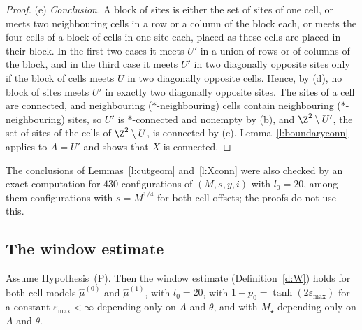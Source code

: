 \begin{proof}
(e) \emph{Conclusion.} A block of sites is either the set of sites of one cell, or meets two neighbouring cells in a row or a column of the block each, or meets the four cells of a block of cells in one site each, placed as these cells are placed in their block. In the first two cases it meets $U'$ in a union of rows or of columns of the block, and in the third case it meets $U'$ in two diagonally opposite sites only if the block of cells meets $U$ in two diagonally opposite cells. Hence, by (d), no block of sites meets $U'$ in exactly two diagonally opposite sites. The sites of a cell are connected, and neighbouring ($*$-neighbouring) cells contain neighbouring ($*$-neighbouring) sites, so $U'$ is $*$-connected and nonempty by (b), and $\Z^2 \setminus U'$, the set of sites of the cells of $\Z^2 \setminus U$, is connected by (c). Lemma~\ref{l:boundaryconn} applies to $A = U'$ and shows that $X$ is connected.
\end{proof}

The conclusions of Lemmas~\ref{l:cutgeom} and~\ref{l:Xconn} were also checked by an exact computation for $430$ configurations of $(M, s, y, i)$ with $l_0 = 20$, among them configurations with $s = M^{1/4}$ for both cell offsets; the proofs do not use this.

\subsection{The window estimate}\label{s:windowproof}

\begin{theorem}\label{t:cutMOS}
Assume Hypothesis~(P). Then the window estimate (Definition~\ref{d:W}) holds for both cell models $\hat\mu^{(0)}$ and $\hat\mu^{(1)}$, with $l_0 = 20$, with $1 - p_0 = \tanh(2 \varepsilon_{\max})$ for a constant $\varepsilon_{\max} < \infty$ depending only on $A$ and $\theta$, and with $M_\star$ depending only on $A$ and $\theta$.
\end{theorem}


